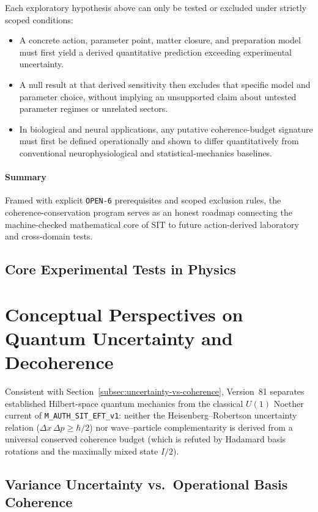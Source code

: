Each exploratory hypothesis above can only be tested or excluded under strictly scoped conditions:
\begin{itemize}
    \item A concrete action, parameter point, matter closure, and preparation model must first yield a derived quantitative prediction exceeding experimental uncertainty.
    \item A null result at that derived sensitivity then excludes that specific model and parameter choice, without implying an unsupported claim about untested parameter regimes or unrelated sectors.
    \item In biological and neural applications, any putative coherence-budget signature must first be defined operationally and shown to differ quantitatively from conventional neurophysiological and statistical-mechanics baselines.
\end{itemize}

\paragraph{Summary}

Framed with explicit \texttt{OPEN-6} prerequisites and scoped exclusion rules, the coherence-conservation program serves as an honest roadmap connecting the machine-checked mathematical core of SIT to future action-derived laboratory and cross-domain tests.

\subsection{Core Experimental Tests in Physics}

\section{Conceptual Perspectives on Quantum Uncertainty and Decoherence}
\label{sec:quantum_reinterpret}

Consistent with Section~\ref{subsec:uncertainty-vs-coherence}, Version~81 separates established Hilbert-space quantum mechanics from the classical $U(1)$ Noether current of \texttt{M\_AUTH\_SIT\_EFT\_v1}: neither the Heisenberg--Robertson uncertainty relation ($\Delta x\,\Delta p \ge \hbar/2$) nor wave--particle complementarity is derived from a universal conserved coherence budget (which is refuted by Hadamard basis rotations and the maximally mixed state $I/2$).

\subsection{Variance Uncertainty vs.\ Operational Basis Coherence}

